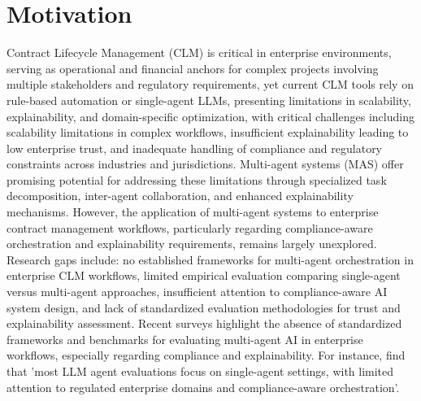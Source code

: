 
\section{Motivation}\label{section:motivation}

Contract Lifecycle Management (CLM) \cite{wikipedia2025contractlifecyclemanagement} is critical in enterprise environments, serving as operational and financial anchors for complex projects involving multiple stakeholders and regulatory requirements, yet current CLM tools rely on rule-based automation or single-agent LLMs, presenting limitations in scalability, explainability, and domain-specific optimization, with critical challenges including scalability limitations in complex workflows, insufficient explainability leading to low enterprise trust, and inadequate handling of compliance and regulatory constraints across industries and jurisdictions.
\newline
\break
Multi-agent systems (MAS) offer promising potential for addressing these limitations through specialized task decomposition, inter-agent collaboration, and enhanced explainability mechanisms. However, the application of multi-agent systems to enterprise contract management workflows, particularly regarding compliance-aware orchestration and explainability requirements, remains largely unexplored.
\newline
\break
Research gaps include: no established frameworks for multi-agent orchestration in enterprise CLM workflows, limited empirical evaluation comparing single-agent versus multi-agent approaches, insufficient attention to compliance-aware AI system design, and lack of standardized evaluation methodologies for trust and explainability assessment. Recent surveys highlight the absence of standardized frameworks and benchmarks for evaluating multi-agent AI in enterprise workflows, especially regarding compliance and explainability. For instance, \cite{yehudai2025llmagentevaluationregulated} find that 'most LLM agent evaluations focus on single-agent settings, with limited attention to regulated enterprise domains and compliance-aware orchestration'.
